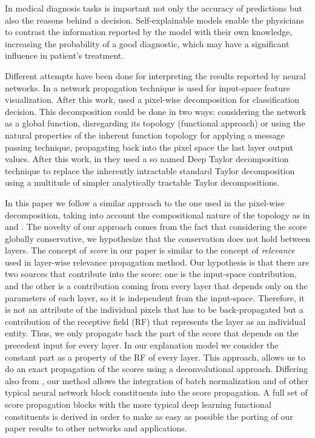 \documentclass[preprint]{elsarticle}
\theoremstyle{definition} %
\theoremstyle{remark}
\begin{document}
In medical diagnosis tasks is important not only the accuracy of predictions but also the reasons behind a decision. Self-explainable models enable the physicians to contrast the information reported by the model with their own knowledge, increasing the probability of a good diagnostic, which may have a significant influence in patient's treatment.  

Different attempts have been done for interpreting the results reported by neural networks. In \cite{zeiler2014visualizing} a network propagation technique is used for input-space feature visualization. After this work, \cite{bach2015pixel} used a pixel-wise decomposition for classification decision. This decomposition could be done in two ways: considering the network as a global function, disregarding its topology (functional approach) or using the natural properties of the inherent function topology for applying a message passing technique, propagating back into the pixel space the last layer output values. After this work, in \cite{montavon2017explaining} they used a so named Deep Taylor decomposition technique to replace the inherently intractable standard Taylor decomposition using a multitude of simpler analytically tractable Taylor decompositions.

In this paper we follow a similar approach to the one used in the pixel-wise decomposition, taking into account the compositional nature of the topology as in \cite{zeiler2014visualizing} and \cite{bach2015pixel}. The novelty of our approach comes from the fact that considering the score globally conservative, we hypothesize that the conservation does not hold between layers. The concept of \emph{score} in our paper is similar to the concept of \emph{relevance} used in layer-wise relevance propagation method. Our hypothesis is that there are two sources that contribute into the score: one is the input-space contribution, and the other is a contribution coming from every layer that depends only on the parameters of each layer, so it is independent from the input-space. Therefore, it is not an attribute of the individual pixels that has to be back-propagated but a contribution of the receptive field (RF) that represents the layer as an individual entity. Thus, we only propagate back the part of the score that depends on the precedent input for every layer. In our explanation model we consider the constant part as a property of the RF of every layer. This approach, allows us to do an exact propagation of the scores using a deconvolutional approach. Differing also from \cite{zeiler2014visualizing}, our method allows the integration of batch normalization and of other typical neural network block constituents into the score propagation. A full set of score propagation blocks with the more typical deep learning functional constituents is derived in order to make as easy as possible the porting of our paper results to other networks and applications.
\end{document}
